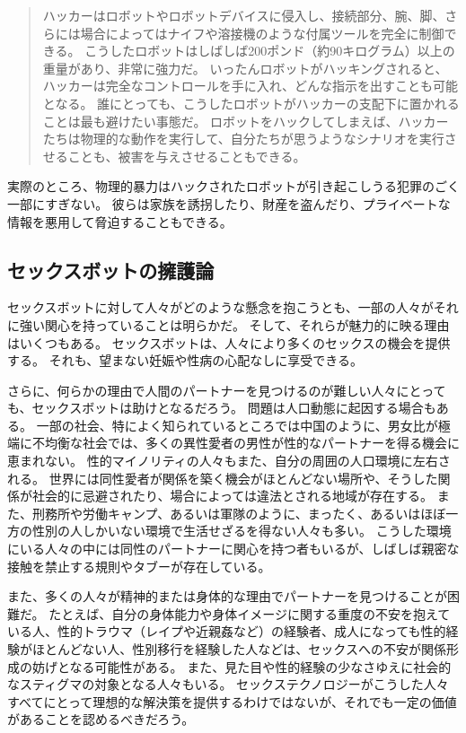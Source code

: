 \documentclass[paper=a4,book,openany]{jlreq}
\begin{document}
\begin{quote}
ハッカーはロボットやロボットデバイスに侵入し、接続部分、腕、脚、さらには場合によってはナイフや溶接機のような付属ツールを完全に制御できる。
こうしたロボットはしばしば200ポンド（約90キログラム）以上の重量があり、非常に強力だ。
いったんロボットがハッキングされると、ハッカーは完全なコントロールを手に入れ、どんな指示を出すことも可能となる。
誰にとっても、こうしたロボットがハッカーの支配下に置かれることは最も避けたい事態だ。
ロボットをハックしてしまえば、ハッカーたちは物理的な動作を実行して、自分たちが思うようなシナリオを実行させることも、被害を与えさせることもできる。
\citep{oberhaus17:_secur_resear_hacked_bluet_enabl_butt_plug}
\end{quote}

実際のところ、物理的暴力はハックされたロボットが引き起こしうる犯罪のごく一部にすぎない。
彼らは家族を誘拐したり、財産を盗んだり、プライベートな情報を悪用して脅迫することもできる。

\subsection{セックスボットの擁護論}

セックスボットに対して人々がどのような懸念を抱こうとも、一部の人々がそれに強い関心を持っていることは明らかだ。
そして、それらが魅力的に映る理由はいくつもある。
セックスボットは、人々により多くのセックスの機会を提供する。
それも、望まない妊娠や性病の心配なしに享受できる。

さらに、何らかの理由で人間のパートナーを見つけるのが難しい人々にとっても、セックスボットは助けとなるだろう。
問題は人口動態に起因する場合もある。
一部の社会、特によく知られているところでは中国のように、男女比が極端に不均衡な社会では、多くの異性愛者の男性が性的なパートナーを得る機会に恵まれない。
性的マイノリティの人々もまた、自分の周囲の人口環境に左右される。
世界には同性愛者が関係を築く機会がほとんどない場所や、そうした関係が社会的に忌避されたり、場合によっては違法とされる地域が存在する。
また、刑務所や労働キャンプ、あるいは軍隊のように、まったく、あるいはほぼ一方の性別の人しかいない環境で生活せざるを得ない人々も多い。
こうした環境にいる人々の中には同性のパートナーに関心を持つ者もいるが、しばしば親密な接触を禁止する規則やタブーが存在している。

また、多くの人々が精神的または身体的な理由でパートナーを見つけることが困難だ。
たとえば、自分の身体能力や身体イメージに関する重度の不安を抱えている人、性的トラウマ（レイプや近親姦など）の経験者、成人になっても性的経験がほとんどない人、性別移行を経験した人などは、セックスへの不安が関係形成の妨げとなる可能性がある。
また、見た目や性的経験の少なさゆえに社会的なスティグマの対象となる人々もいる。
セックステクノロジーがこうした人々すべてにとって理想的な解決策を提供するわけではないが、それでも一定の価値があることを認めるべきだろう。
\end{document}
